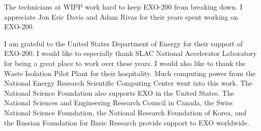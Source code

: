 The technicians at WIPP work hard to keep EXO-200 from breaking down. I appreciate Jon Eric Davis and Adam Rivas for their years spent working on EXO-200.

I am grateful to the United States Department of Energy for their support of EXO-200. I would like to especially thank SLAC National Accelerator Laboratory for being a great place to work over these years. I would also like to thank the Waste Isolation Pilot Plant for their hospitality. Much computing power from the National Energy Research Scientific Computing Center went into this work. The National Science Foundation also supports EXO in the United States. The National Sciences and Engineering Research Council in Canada, the Swiss National Science Foundation, the National Research Foundation of Korea, and the Russian Foundation for Basic Research provide support to EXO worldwide.
